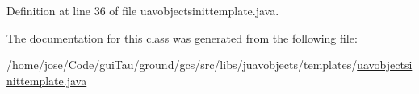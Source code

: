 Definition at line 36 of file uavobjectsinittemplate.\-java.



The documentation for this class was generated from the following file\-:\begin{DoxyCompactItemize}
\item 
/home/jose/\-Code/gui\-Tau/ground/gcs/src/libs/juavobjects/templates/\hyperlink{uavobjectsinittemplate_8java}{uavobjectsinittemplate.\-java}\end{DoxyCompactItemize}
